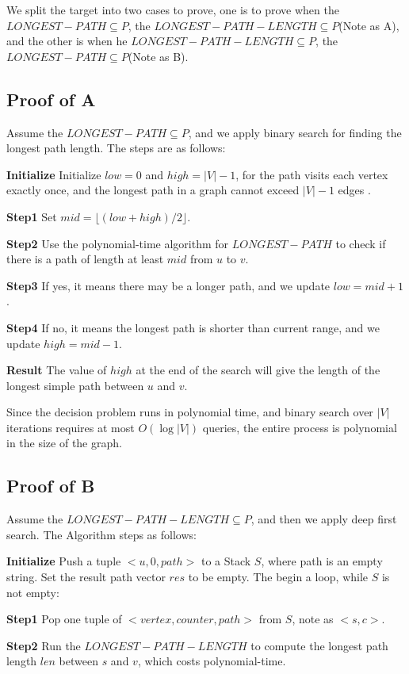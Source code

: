 \documentclass[12pt]{article}
\begin{document}
We split the target into two cases to prove, one is to prove when the $LONGEST-PATH \subseteq P$, the $LONGEST-PATH-LENGTH \subseteq P$(Note as A), and the other is when he $LONGEST-PATH-LENGTH \subseteq P$, the $LONGEST-PATH \subseteq P$(Note as B).
 
\subsection{Proof of A}
Assume the $LONGEST-PATH \subseteq P$, and we apply binary search for finding the longest path length. The steps are as follows:

\textbf{Initialize} Initialize $low = 0$ and $high = |V| - 1$, for the path visits each vertex exactly once, and the longest path in a graph cannot exceed $|V| - 1$ edges . 

\textbf{Step1} Set $mid = \lfloor (low + high) / 2 \rfloor$.

\textbf{Step2} Use the polynomial-time algorithm for $LONGEST-PATH$ to check if there is a path of length at least $mid$ from $u$ to $v$.

\textbf{Step3} If yes, it means there may be a longer path, and we update $low = mid + 1$.

\textbf{Step4} If no, it means the longest path is shorter than current range, and we update $high = mid - 1$.

\textbf{Result} The value of $high$ at the end of the search will give the length of the longest simple path between $u$ and $v$.

Since the decision problem runs in polynomial time, and binary search over $|V|$ iterations requires at most $O(\log |V|)$ queries, the entire process is polynomial in the size of the graph.

\subsection{Proof of B}
Assume the $LONGEST-PATH-LENGTH \subseteq P$, and then we apply deep first search. The Algorithm steps as follows:
 
\textbf{Initialize} Push a tuple $<u, 0, path>$ to a Stack $S$, where path is an empty string. Set the result path vector $res$ to be empty. The begin a loop, while $S$ is not empty:

\textbf{Step1} Pop one tuple of $<vertex, counter, path>$ from $S$, note as $<s, c>$. 

\textbf{Step2} Run the $LONGEST-PATH-LENGTH$ to compute the longest path length $len$ between $s$ and $v$, which costs polynomial-time.
\end{document}
